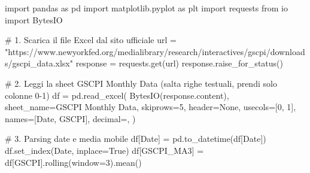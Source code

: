 \documentclass[
  11pt,
  letterpaper,
  DIV=11,
  numbers=noendperiod]{scrartcl}
\newenvironment{Shaded}{\begin{snugshade}}{\end{snugshade}}
\newcommand{\CommentTok}[1]{\textcolor[rgb]{0.37,0.37,0.37}{#1}}
\newcommand{\DecValTok}[1]{\textcolor[rgb]{0.68,0.00,0.00}{#1}}
\newcommand{\ImportTok}[1]{\textcolor[rgb]{0.00,0.46,0.62}{#1}}
\newcommand{\NormalTok}[1]{\textcolor[rgb]{0.00,0.23,0.31}{#1}}
\newcommand{\OperatorTok}[1]{\textcolor[rgb]{0.37,0.37,0.37}{#1}}
\newcommand{\StringTok}[1]{\textcolor[rgb]{0.13,0.47,0.30}{#1}}
\newcommand{\VariableTok}[1]{\textcolor[rgb]{0.07,0.07,0.07}{#1}}
\begin{document}
\begin{Shaded}
\begin{Highlighting}[]
\ImportTok{import}\NormalTok{ pandas }\ImportTok{as}\NormalTok{ pd}
\ImportTok{import}\NormalTok{ matplotlib.pyplot }\ImportTok{as}\NormalTok{ plt}
\ImportTok{import}\NormalTok{ requests}
\ImportTok{from}\NormalTok{ io }\ImportTok{import}\NormalTok{ BytesIO}

\CommentTok{\# 1. Scarica il file Excel dal sito ufficiale}
\NormalTok{url }\OperatorTok{=} \StringTok{"https://www.newyorkfed.org/medialibrary/research/interactives/gscpi/downloads/gscpi\_data.xlsx"}
\NormalTok{response }\OperatorTok{=}\NormalTok{ requests.get(url)}
\NormalTok{response.raise\_for\_status()}

\CommentTok{\# 2. Leggi la sheet \textquotesingle{}GSCPI Monthly Data\textquotesingle{} (salta righe testuali, prendi solo colonne 0{-}1)}
\NormalTok{df }\OperatorTok{=}\NormalTok{ pd.read\_excel(}
\NormalTok{    BytesIO(response.content),}
\NormalTok{    sheet\_name}\OperatorTok{=}\StringTok{\textquotesingle{}GSCPI Monthly Data\textquotesingle{}}\NormalTok{,}
\NormalTok{    skiprows}\OperatorTok{=}\DecValTok{5}\NormalTok{,}
\NormalTok{    header}\OperatorTok{=}\VariableTok{None}\NormalTok{,}
\NormalTok{    usecols}\OperatorTok{=}\NormalTok{[}\DecValTok{0}\NormalTok{, }\DecValTok{1}\NormalTok{],}
\NormalTok{    names}\OperatorTok{=}\NormalTok{[}\StringTok{\textquotesingle{}Date\textquotesingle{}}\NormalTok{, }\StringTok{\textquotesingle{}GSCPI\textquotesingle{}}\NormalTok{],}
\NormalTok{    decimal}\OperatorTok{=}\StringTok{\textquotesingle{},\textquotesingle{}}
\NormalTok{)}

\CommentTok{\# 3. Parsing date e media mobile}
\NormalTok{df[}\StringTok{\textquotesingle{}Date\textquotesingle{}}\NormalTok{] }\OperatorTok{=}\NormalTok{ pd.to\_datetime(df[}\StringTok{\textquotesingle{}Date\textquotesingle{}}\NormalTok{])}
\NormalTok{df.set\_index(}\StringTok{\textquotesingle{}Date\textquotesingle{}}\NormalTok{, inplace}\OperatorTok{=}\VariableTok{True}\NormalTok{)}
\NormalTok{df[}\StringTok{\textquotesingle{}GSCPI\_MA3\textquotesingle{}}\NormalTok{] }\OperatorTok{=}\NormalTok{ df[}\StringTok{\textquotesingle{}GSCPI\textquotesingle{}}\NormalTok{].rolling(window}\OperatorTok{=}\DecValTok{3}\NormalTok{).mean()}


\end{Highlighting}
\end{Shaded}
\end{document}
